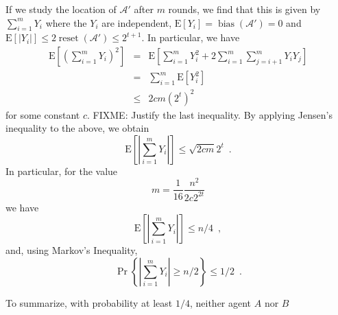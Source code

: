 \documentclass[lotsofwhite]{patmorin}
\newcommand{\E}{\mathrm{E}}
\newcommand{\A}{\mathcal{A}}
\DeclareMathOperator{\bias}{bias}
\DeclareMathOperator{\reset}{reset}
\begin{document}
If we study the location of $\A'$ after $m$ rounds, we find that this
is given by 
$\sum_{i=1}^m Y_i$
where the $Y_i$ are independent, $\E[Y_i] = \bias(\A') = 0$ and $\E[|Y_i|]\le
2\reset(\A') \le
2^{t+1}$. In particular, we have
\begin{eqnarray*}
  \E\left[\left(\sum_{i=1}^m Y_i\right)^2\right]
   & = & \E\left[\sum_{i=1}^m Y_i^2 
          + 2\sum_{i=1}^m\sum_{j=i+1}^m Y_iY_j\right] \\
   & = & \sum_{i=1}^m \E[Y_i^2] \\
   & \le & 2cm (2^t)^2
\end{eqnarray*}
for some constant $c$.
FIXME: Justify the last inequality.  By applying Jensen's inequality
to the above, we obtain
\[
     \E\left[\left|\sum_{i=1}^m Y_i\right|\right] \le \sqrt{2cm}2^t \enspace .
\]
In particular, for the value 
\[
    m=\frac{1}{16}\frac{n^2}{2c2^{2t}}
\]
we have
\[
     \E\left[\left|\sum_{i=1}^m Y_i\right|\right] \le n/4 \enspace ,
\]
and, using Markov's Inequality,
\[
     \Pr\left\{\left|\sum_{i=1}^m Y_i\right| \ge n/2\right\} \le 1/2 \enspace .
\]

To summarize, with probability at least $1/4$, neither agent $A$ nor
$B$ 


\begin{lem}

\end{lem}
\end{document}
